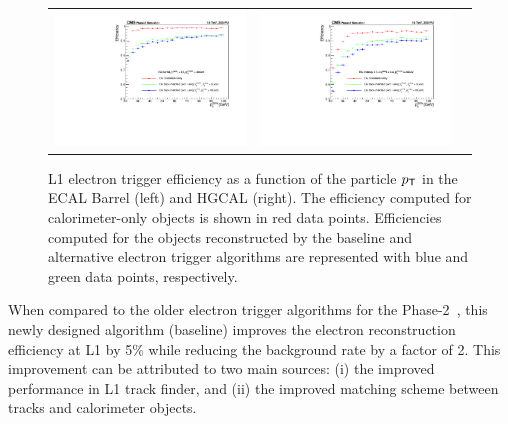  \begin{figure}[tbh!]
 \begin{center}
 \begin{tabular}{ccc}
  \includegraphics[width=.45\linewidth]{figures/Part2/Upgrade/eff_barrel}&
  \includegraphics[width=.45\linewidth]{figures/Part2/Upgrade/eff_endcap}&
 \end{tabular}
 \caption{\ac{L1} electron trigger efficiency as a function of the particle $p_{\textsf{T}}$ in the \ac{ECAL} Barrel (left) and \ac{HGCAL} (right). The efficiency computed for calorimeter-only objects is shown in red data points. Efficiencies computed for the objects reconstructed by the baseline and alternative electron trigger algorithms are represented with blue and green data points, respectively.}
 \label{fig:eff_electron}
 \end{center}
\end{figure}

When compared to the older electron trigger algorithms for the Phase-2~\cite{Contardo:2015bmq}, this newly designed algorithm (baseline) improves the electron reconstruction efficiency at \ac{L1} by 5\% while reducing the background rate by a factor of 2. This improvement can be attributed to two main sources: (i) the improved performance in \ac{L1} track finder, and (ii) the improved matching scheme between tracks and calorimeter objects.